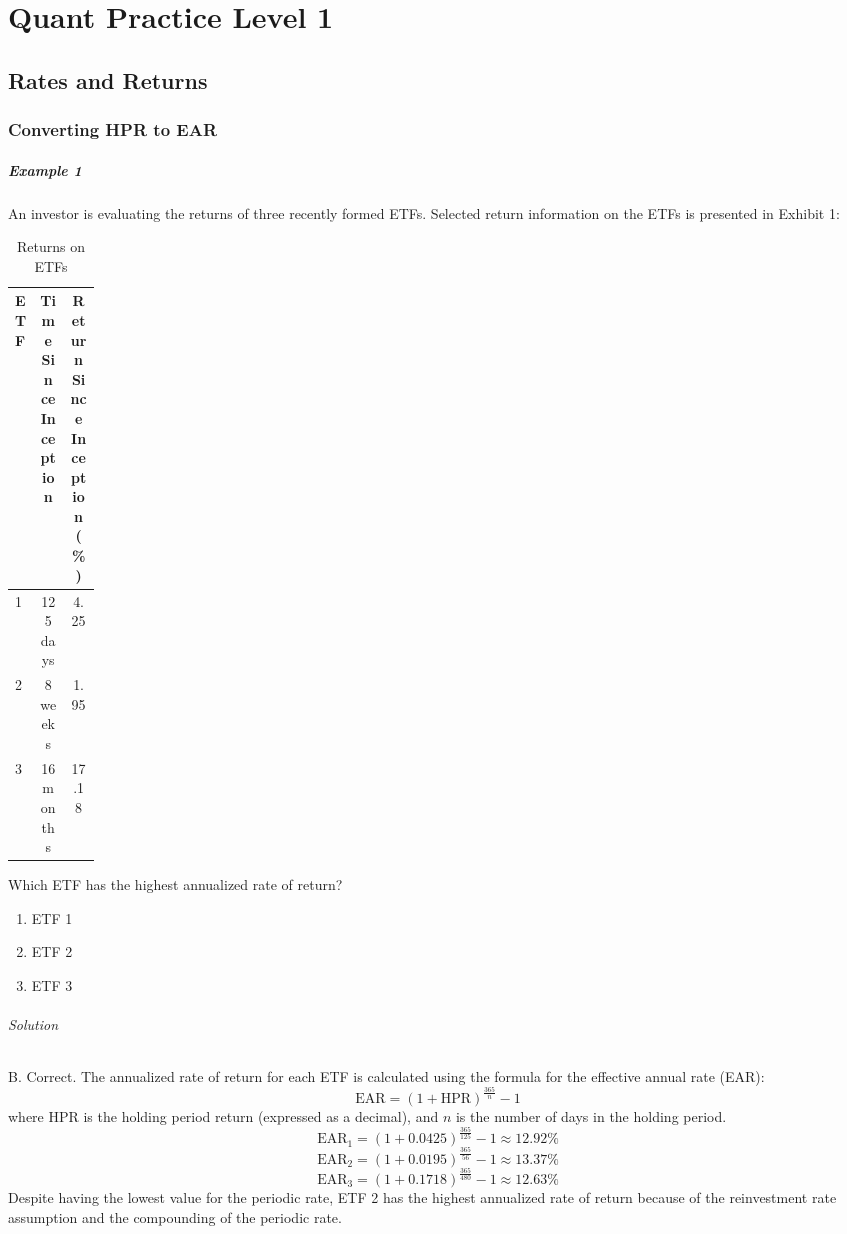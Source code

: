 \chapter{Quant Practice Level 1}
\label{chap:Quant Practice Level 1}
\section{Rates and Returns}
\label{sec:Rates and Returns}
\subsection{Converting HPR to EAR} %
\label{sub:Converting HPR to EAR}

\paragraph{Example 1} %
An investor is evaluating the returns of three recently formed ETFs. Selected return information on the ETFs is presented in Exhibit 1:
\begin{table}[H]
	\caption{Returns on ETFs}
	\begin{center}
		\label{tab:M1ex1}
		\begin{tabular}{p{0.1\linewidth} | c | c}
			\toprule
			\textbf{ETF} & \textbf{Time Since Inception} & \textbf{Return Since Inception (\%)}                                            \\
			\midrule
			1             & 125 days & 4.25                                                            \\
			2             & 8 weeks  & 1.95                                                            \\
			3             & 16 months& 17.18                                                           \\
			\bottomrule
		\end{tabular}
	\end{center}
\end{table}
Which ETF has the highest annualized rate of return?
\begin{enumerate}[label=\Alph*.]
	\item ETF 1
	\item ETF 2
	\item ETF 3
\end{enumerate}
\subparagraph{Solution} %
B. Correct. The annualized rate of return for each ETF is calculated using the formula for the effective annual rate (EAR):
\[
\text{EAR} = \left(1 + \text{HPR}\right)^{\frac{365}{n}} - 1
\]
where HPR is the holding period return (expressed as a decimal), and $n$ is the number of days in the holding period.
	\[
	\text{EAR}_1 = (1 + 0.0425)^{\frac{365}{125}} - 1 \approx 12.92\%
	\]
	\[
	\text{EAR}_2 = (1 + 0.0195)^{\frac{365}{56}} - 1 \approx 13.37\%
	\]
	\[
	\text{EAR}_3 = (1 + 0.1718)^{\frac{365}{480}} - 1 \approx 12.63\%
	\]
Despite having the lowest value for the periodic rate, ETF 2 has the highest annualized rate of return because of the reinvestment rate assumption and the compounding of the periodic rate.

